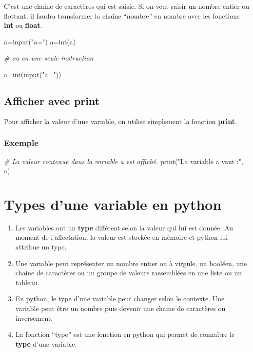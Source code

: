 \documentclass[11pt]{article}
\newenvironment{Shaded}{}{}
\newcommand{\StringTok}[1]{\textcolor[rgb]{0.25,0.44,0.63}{{#1}}}
\newcommand{\CommentTok}[1]{\textcolor[rgb]{0.38,0.63,0.69}{\textit{{#1}}}}
\newcommand{\NormalTok}[1]{{#1}}
\newcommand{\OperatorTok}[1]{\textcolor[rgb]{0.40,0.40,0.40}{{#1}}}
\newcommand{\BuiltInTok}[1]{{#1}}
\begin{document}
C'est une chaine de caractères qui est saisie. Si on veut saisir un
nombre entier ou flottant, il faudra transformer la chaine ``nombre'' en
nombre avec les fonctions \textbf{int} ou \textbf{float}.

\begin{Shaded}
\begin{Highlighting}[]
\NormalTok{a}\OperatorTok{=}\BuiltInTok{input}\NormalTok{(}\StringTok{"a="}\NormalTok{)}
\NormalTok{a}\OperatorTok{=}\BuiltInTok{int}\NormalTok{(a)}

\CommentTok{\# ou en une seule instruction}

\NormalTok{a}\OperatorTok{=}\BuiltInTok{int}\NormalTok{(}\BuiltInTok{input}\NormalTok{(}\StringTok{"a="}\NormalTok{))}
\end{Highlighting}
\end{Shaded}

\hypertarget{afficher-avec-print}{%
\subsection{Afficher avec print}\label{afficher-avec-print}}

Pour afficher la valeur d'une variable, on utilise simplement la
fonction \textbf{print}.

\hypertarget{exemple-2}{%
\subsubsection*{Exemple}\label{exemple-2}}

\begin{Shaded}
\begin{Highlighting}[]
\CommentTok{\# La valeur contenue dans la variable a est affiché.}
\BuiltInTok{print}\NormalTok{(}\StringTok{"La variable a vaut :"}\NormalTok{, a)}
\end{Highlighting}
\end{Shaded}

    \hypertarget{types-dune-variable-en-python}{%
\section{Types d'une variable en
python}\label{types-dune-variable-en-python}}

\begin{enumerate}
\def\labelenumi{\arabic{enumi}.}
\item
  Les variables ont un \textbf{type} différent selon la valeur qui lui
  est donnée. Au moment de l'affectation, la valeur est stockée en
  mémoire et python lui attribue un type.
\item
  Une variable peut représenter un nombre entier ou à virgule, un
  booléen, une chaine de caractères ou un groupe de valeurs rassemblées
  en une liste ou un tableau.
\item
  En python, le type d'une variable peut changer selon le contexte. Une
  variable peut être un nombre puis devenir une chaine de caractères ou
  inversement.
\item
  La fonction ``type'' est une fonction en python qui permet de
  connaître le \textbf{type} d'une variable.
\end{enumerate}
\end{document}
